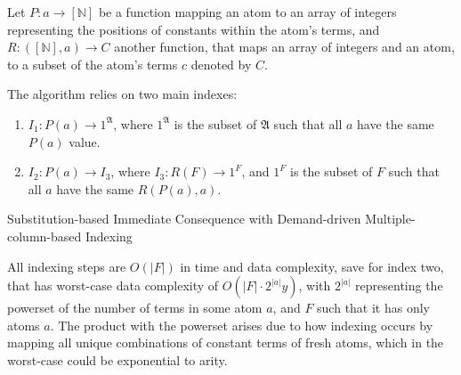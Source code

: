 \documentclass[sigconf,screen,review,natbib]{acmart}
\theoremstyle{definition}
\begin{document}
Let $P : a \to [\mathbb{N}]$ be a function mapping an atom to an array of integers representing the positions of constants within the atom's terms, and
$R : ([\mathbb{N}], a) \to C$ another function, that maps an array of integers and an atom, to a subset of the atom's terms $c$ denoted by $C$.

The algorithm relies on two main indexes:
\begin{enumerate}
	\item $I_1 : P(a) \to 1^{\mathfrak{A}}$, where $1^{\mathfrak{A}}$ is the subset of
	      $\mathfrak{A}$ such that all $a$ have the same $P(a)$ value.
	\item $I_2 : P(a) \to I_3$, where $I_3 : R(F) \to 1^{F}$, and $1^{F}$ is the subset
	      of $F$ such that all $a$ have the same $R(P(a), a)$.
\end{enumerate}
\begin{algorithm}
	\SetAlgoLined
	\caption{Substitution-based Immediate Consequence with Demand-driven Multiple-column-based Indexing}
\end{algorithm}
All indexing steps are $O(|F|)$ in time and data complexity, save for index two, that has worst-case data complexity of $O(|F| \cdot 2^{|a|}y)$, with $2^{|a|}$
representing the powerset of the number of terms in some atom $a$, and $F$ such that it has only atoms $a$. The product with the powerset arises due to how
indexing occurs by mapping all unique combinations of constant terms of fresh atoms, which in the worst-case could be exponential to arity.
\end{document}
